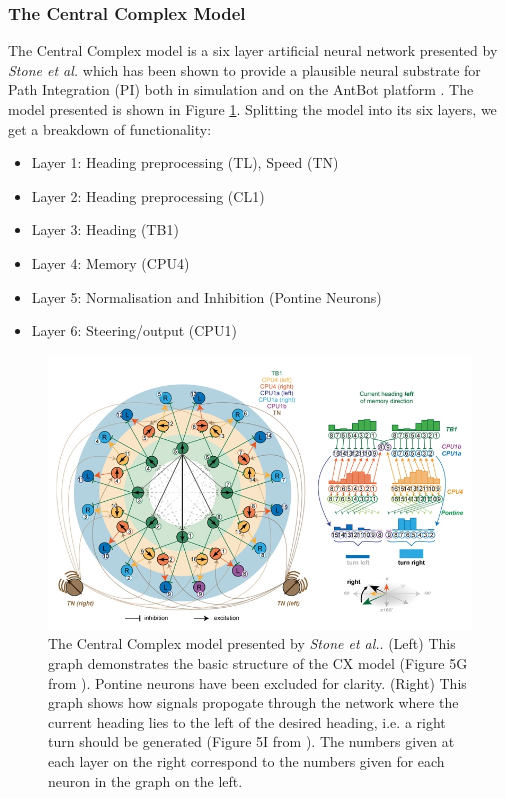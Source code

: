 \documentclass[a4paper,11pt,twoside,openright]{article}
\begin{document}
\subsubsection{The Central Complex Model}
The Central Complex model is a six layer artificial neural network presented by
\textit{Stone et al.} which has been shown to provide a plausible neural
substrate for Path Integration (PI) both in simulation and on the AntBot platform
\cite{Scimeca2017, Stone2017}. The model presented is shown in Figure
\ref{fig:cx}. Splitting the model into its six layers, we get a breakdown of
functionality:
\newline
\par

\begin{itemize}
\item{Layer 1: Heading preprocessing (TL), Speed (TN)}
\item{Layer 2: Heading preprocessing (CL1)}
\item{Layer 3: Heading (TB1)}
\item{Layer 4: Memory (CPU4)}
\item{Layer 5: Normalisation and Inhibition (Pontine Neurons)}
\item{Layer 6: Steering/output (CPU1)}
\end{itemize}

\begin{figure}[h!]
  \centering
  \includegraphics[width=\textwidth]{StoneCXModel}
  \caption{\label{fig:cx} The Central Complex model presented by
    \textit{Stone et al.}. (Left) This graph demonstrates the basic structure of
    the CX model (Figure 5G from \cite{Stone2017}). Pontine neurons have been
    excluded for clarity.
    (Right) This graph shows how signals propogate through the network where the
    current heading lies to the left of the desired heading, i.e. a right turn
    should be generated (Figure 5I from \cite{Stone2017}). The numbers given at
    each layer on the right correspond to the numbers given for each neuron
    in the graph on the left.
  }
\end{figure}
\end{document}
